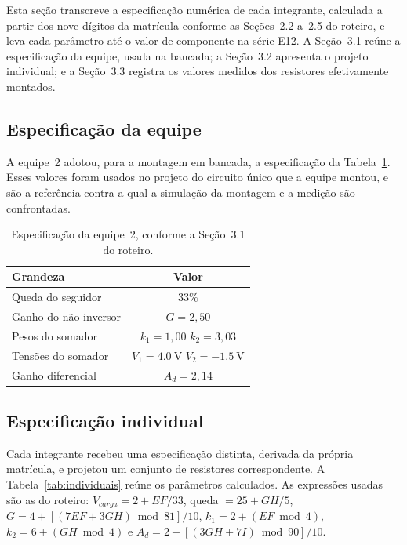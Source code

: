 \documentclass[11pt,a4paper]{article}
\begin{document}
Esta seção transcreve a especificação numérica de cada integrante, calculada a partir dos nove dígitos da matrícula conforme as Seções~2.2 a~2.5 do roteiro, e leva cada parâmetro até o valor de componente na série E12. A Seção~3.1 reúne a especificação da equipe, usada na bancada; a Seção~3.2 apresenta o projeto individual; e a Seção~3.3 registra os valores medidos dos resistores efetivamente montados.

\subsection{Especificação da equipe}

A equipe~2 adotou, para a montagem em bancada, a especificação da Tabela~\ref{tab:equipe}. Esses valores foram usados no projeto do circuito único que a equipe montou, e são a referência contra a qual a simulação da montagem e a medição são confrontadas.

\begin{table}[h]
\centering
\caption{Especificação da equipe~2, conforme a Seção~3.1 do roteiro.}
\label{tab:equipe}
\begin{tabular}{lc}
\hline
Grandeza & Valor \\
\hline
Queda do seguidor & $33\%$ \\
Ganho do não inversor & $G = 2{,}50$ \\
Pesos do somador & $k_1 = 1{,}00$ \quad $k_2 = 3{,}03$ \\
Tensões do somador & $V_1 = \SI{4,0}{\volt}$ \quad $V_2 = \SI{-1,5}{\volt}$ \\
Ganho diferencial & $A_d = 2{,}14$ \\
\hline
\end{tabular}
\end{table}

\subsection{Especificação individual}

Cada integrante recebeu uma especificação distinta, derivada da própria matrícula, e projetou um conjunto de resistores correspondente. A Tabela~\ref{tab:individuais} reúne os parâmetros calculados. As expressões usadas são as do roteiro: $V_{carga} = 2 + EF/33$, queda $= 25 + GH/5$, $G = 4 + [(7EF + 3GH) \bmod 81]/10$, $k_1 = 2 + (EF \bmod 4)$, $k_2 = 6 + (GH \bmod 4)$ e $A_d = 2 + [(3GH + 7I) \bmod 90]/10$.
\end{document}
